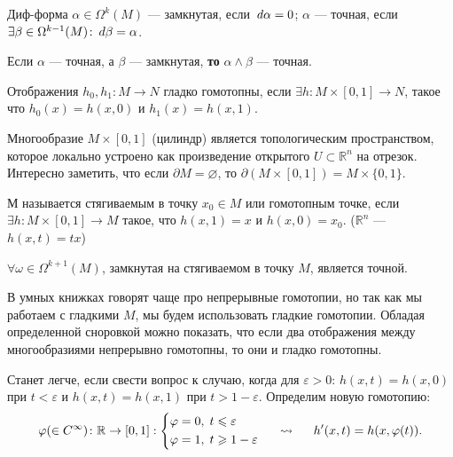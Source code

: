 \begin{to_def}
	Диф-форма $\alpha \in \Omega^k (M)$ --- замкнутая, если $\d \alpha = 0$; $\alpha$ --- точная, если $\exists \beta \in \Omega^{k-1} (M) \colon \d \beta = \alpha$.
	\label{def_7.9}
\end{to_def}

\begin{to_tas}
	Если $\alpha$ --- точная, а $\beta$ --- замкнутая, \textbf{то} $\alpha \wedge \beta$ --- точная.
	\label{tas_7.10}
\end{to_tas}

\begin{to_def}
	Отображения $h_0, h_1 \colon M \rightarrow N$ гладко гомотопны, если $\exists h \colon M \times [0,1] \rightarrow N$, такое что $h_0(x) = h(x,0)$ и $h_1(x) = h(x,1)$.
	\label{def_7.12}
\end{to_def}

Многообразие $M \times [0,1]$ (цилиндр) является топологическим пространством, которое локально устроено как произведение открытого $U\subset \mathbb{R}^n$ на отрезок.
Интересно заметить, что если $\partial M = \varnothing$, то $\partial(M \times [0,1]) = M \times \{0,1\}$. 

\begin{to_def}
	М называется стягиваемым в точку $x_0 \in M$ или гомотопным точке, если $\exists h \colon M \times [0,1] \rightarrow M$ такое, что $h(x,1) = x$ и $h(x,0) = x_0$. ($\mathbb{R}^n$ --- $h(x,t) = t x$)
\end{to_def}

\begin{to_thr}
	$\forall \omega \in \Omega^{k+1}(M)$, замкнутая на стягиваемом в точку $M$, является точной.
	\label{thr_poin}
\end{to_thr}

В умных книжках говорят чаще про непрерывные гомотопии, но так как мы работаем с гладкими $M$, мы будем использовать гладкие гомотопии. Обладая определенной сноровкой можно показать, что если два отображения между многообразиями непрерывно гомотопны, то они и гладко гомотопны.

Станет легче, если свести вопрос к случаю, когда для $\varepsilon > 0$: $h(x,t) = h(x,0)$ при $t < \varepsilon$ и $h(x,t) = h(x,1)$ при $t > 1-\varepsilon$.
Определим новую гомотопию:
\begin{equation*}
\varphi(\in C^\infty) \colon \mathbb{R} \rightarrow [0,1]:
\left\{
\begin{aligned}
	&\varphi = 0,\; t \leq \varepsilon\\
	&\varphi = 1,\; t \geq 1-\varepsilon
\end{aligned}
\right.
\hspace*{0.5 cm}  \leadsto \hspace*{0.5 cm}
	h'(x,t)=h(x,\varphi(t)).
\end{equation*} 

